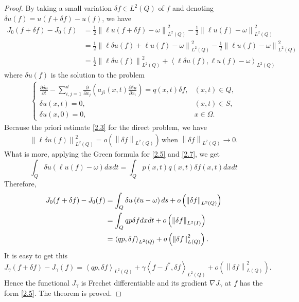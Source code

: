 \documentclass[]{article}
\begin{document}
\begin{proof}
	By taking a small variation $\delta f \in L^2(Q)$ of $f$ and denoting $\delta u(f)=u(f+\delta f)-u(f)$, we have
	\begin{align*}
		J_0(f+\delta f)-J_0(f)&=\frac{1}{2}\left\|\ell u(f+\delta f)-\omega\right\|^2_{L^2(Q)}-\frac{1}{2}\left\|\ell u(f)-\omega\right\|^2_{L^2(Q)}\\
		&=\frac{1}{2}\left\|\ell \delta u(f) +\ell u(f)-\omega\right\|^2_{L^2(Q)}-\frac{1}{2}\left\|\ell u(f)-\omega\right\|^2_{L^2(Q)}\\
		&=\frac{1}{2}\left\|\ell \delta u(f)\right\|^2_{L^2(Q)}+\left\langle \ell \delta u(f), \ell u(f)-\omega\right\rangle_{L^2(Q)}
	\end{align*}
	where $\delta u(f)$ is the solution to the problem
	\begin{align}\label{2.7}
		\begin{cases}
			\frac{\partial \delta u}{\partial t}-\sum\limits_{i, j=1}^{d}\frac{\partial}{\partial x_j}\left(a_{ji}(x, t)\frac{\partial \delta u}{\partial x_i}\right)=q(x, t)\delta f,&(x, t)\in Q,\\
			\delta u(x, t)=0, & (x, t)\in S,\\
			\delta u(x, 0)=0, &x\in \Omega.
		\end{cases}
	\end{align}
	Because the priori estimate \eqref{2.3} for the direct problem, we have
	\begin{align*}
		\left\|\ell\delta u(f)\right\|_{L^2(Q)}^2=o\left(\left\|\delta f\right\|_{L^2(Q)}\right)\, \text{when } \left\|\delta f\right\|_{L^2(Q)}\to 0.
	\end{align*}
	What is more, applying the Green formula for \eqref{2.5} and \eqref{2.7}, we get
	$$\int_{Q} \delta u \left(\ell u(f)-\omega\right)dxdt=\int_{Q} p(x, t)q(x, t)\delta f(x, t)dxdt$$
	Therefore,
	\begin{align*}
		J_0(f+\delta f)-J_0(f)&=\int_{Q}\delta u\left(\ell u-\omega\right)ds+o\left(\left\|\delta f\right\|_{L^2(Q)}\right)\notag\\
		&=\int_Q qp\delta fdxdt+o\left(\left\|\delta f\right\|_{L^2(I)}\right)\notag\\
		&=\left\langle qp,\delta f \right\rangle_{L^2(Q)}+o\left(\left\|\delta f\right\|^2_{L(Q)}\right).
	\end{align*}
	It is easy to get this
	$$J_\gamma(f+\delta f)-J_\gamma(f)=\left\langle qp,\delta f \right\rangle_{L^2(Q)}+\gamma\left\langle f-f^*,\delta f \right\rangle_{L^2(Q)}+o\left(\left\|\delta f\right\|^2_{L(Q)}\right).$$
	Hence the functional $J_\gamma$ is Frechet differentiable and its gradient $\nabla J_\gamma$ at $f$ has the form \eqref{2.5}. The theorem is proved.
\end{proof}
\end{document}

